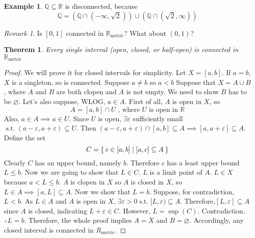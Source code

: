 \documentclass[12pt]{amsart}
\newcommand{\bbR}{\mathbb{R}}
\newcommand{\bbQ}{\mathbb{Q}}
\newcommand{\suchthat}{\operatorname{s.t.}}
\theoremstyle{plain}
\newtheorem*{thm}{Theorem}
\theoremstyle{remark}
\newtheorem*{rmk}{Remark}
\theoremstyle{definition}
\newtheorem*{eg}{Example}
\begin{document}
\begin{eg}
	$\bbQ \subseteq \bbR$ is disconnected, because 
	\begin{equation*}
		\bbQ = (\bbQ \cap (-\infty, \sqrt{2})) \cup (\bbQ \cap (\sqrt{2}, \infty))
	\end{equation*}
\end{eg}

\begin{rmk}
	Is $[0, 1]$ connected in $\bbR_{\text{metric}}$? What about $(0, 1)$?
\end{rmk}

\begin{thm}
	Every single interval (open, closed, or half-open) is connected in $\bbR_{\text{metric}}$
\end{thm}

\begin{proof}
	We will prove it for closed intervals for simplicity.
	\newline
	Let $X = [a, b]$. If $a = b$, $X$ is a singleton, so is connected.
	\newline
	Suppose $a \neq b$ so $a < b$
	\newline
	Suppose that $X = A \cup B$, where $A$ and $B$ are both clopen and $A$ is not empty. We need to show $B$ has to be $\varnothing$.
	Let's also suppose, WLOG, $a \in A$. First of all, $A$ is open in $X$, so 
	\begin{equation*}
		A = [a, b] \cap U \text{ , where } U \text{ is open in } \bbR
	\end{equation*}
	Also, $a \in A \implies a \in U$. Since $U$ is open, $\exists \varepsilon $ sufficiently small $\suchthat (a-\varepsilon, a+\varepsilon) \subseteq U$.
	Then $(a-\varepsilon, a+\varepsilon) \cap [a, b] \subseteq A \implies [a, a+\varepsilon] \subseteq A$.
	\newline
	Define the set 
	\begin{equation*}
		C = \Set{c \in [a, b]| [a, c] \subseteq A}
	\end{equation*}
	Clearly $C$ has an upper bound, namely $b$. Therefore $c$ has a least upper bound $L \leqslant b$.
	\newline
	Now we are going to show that $L \in C$.
	\newline
	$L$ is a limit point of $A$. $L \in X$ because $a < L \leqslant b$. $A$ is clopen in $X$ so $A$ is closed in $X$, so $L \in A \implies [a, L] \subseteq A$.
	\newline
	Now we show that $L = b$. Suppose, for contradiction,  $L < b$.
	\newline
	As $L\in A$ and $A$ is open in $X$, $\exists \varepsilon > 0 \suchthat [L, \varepsilon) \subseteq A$. Therefore,$[L, \varepsilon] \subseteq A$ since $A$ is closed, indicating $L + \varepsilon \in C$. However, $L = \sup(C)$. Contradiction. 
	$\therefore L = b$.
	\newline
	Therefore, the whole proof implies $A = X$ and $B = \varnothing$. Accordingly,  any closed interval is connected in $R_{\text{metric}}$.
\end{proof}
\end{document}
